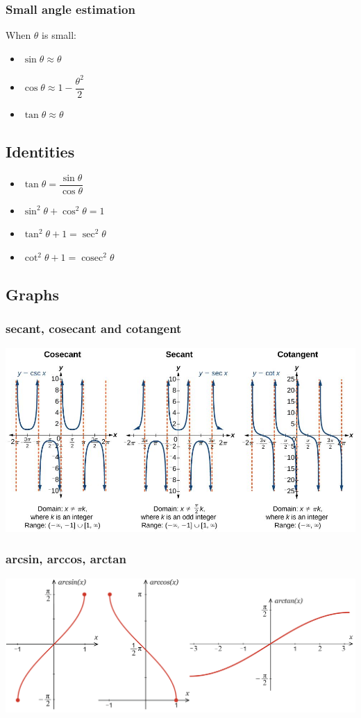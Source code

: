 \documentclass[A4paper]{article}
\DeclareMathOperator\cosec{cosec}
\begin{document}
	\subsubsection{Small angle estimation}
	When $\theta$ is small:
	\begin{itemize}
		\item $\sin \theta \approx \theta$
		\item $\cos \theta \approx 1- \dfrac{\theta^2}{2}$
		\item $\tan \theta \approx \theta$
	\end{itemize}
	\subsection{Identities}
	\begin{itemize}
		\item $\tan \theta = \dfrac{\sin \theta}{\cos \theta}$
		\item $\sin^2 \theta + \cos^2 \theta = 1$
		\item $\tan^2 \theta + 1 = \sec^2 \theta$
		\item $\cot^2 \theta + 1 = \cosec^2 \theta$
	\end{itemize}

	\subsection{Graphs}
	\subsubsection{secant, cosecant and cotangent}
	\includegraphics[scale=0.9]{csc-sec-cot-graphs}

	\subsubsection{arcsin, arccos, arctan}
	\includegraphics[scale=0.7]{arcsincostan}
\end{document}
